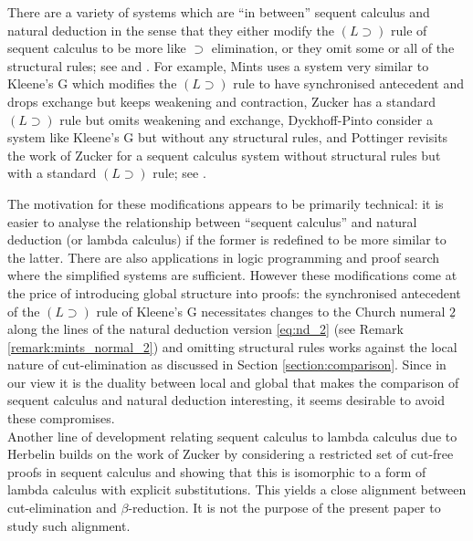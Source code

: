 \documentclass[english,letter paper,12pt,leqno]{article}
\theoremstyle{example}
\numberwithin{equation}{section}
\def\imp{\supset}
\begin{document}
There are a variety of systems which are ``in between'' sequent calculus and natural deduction in the sense that they either modify the $(L \imp)$ rule of sequent calculus to be more like $\imp$ elimination, or they omit some or all of the structural rules; see \cite{negri} and \cite[\S 2.2, \S 2.3, \S 2.4]{negriplato}. For example, Mints uses a system very similar to Kleene's G \cite{kleene} which modifies the $(L \imp)$ rule to have synchronised antecedent and drops exchange but keeps weakening and contraction, Zucker has a standard $(L \imp)$ rule but omits weakening and exchange, Dyckhoff-Pinto \cite{dyckhoffpinto} consider a system like Kleene's G but without any structural rules, and Pottinger \cite{pottinger} revisits the work of Zucker for a sequent calculus system without structural rules but with a standard $(L \imp)$ rule; see \cite[p.331]{pottinger}.

The motivation for these modifications appears to be primarily technical: it is easier to analyse the relationship between ``sequent calculus'' and natural deduction (or lambda calculus) if the former is redefined to be more similar to the latter. There are also applications in logic programming and proof search \cite{dyckhoffpinto} where the simplified systems are sufficient. However these modifications come at the price of introducing global structure into proofs: the synchronised antecedent of the $(L \imp)$ rule of Kleene's G necessitates changes to the Church numeral $\underline{2}$ along the lines of the natural deduction version \eqref{eq:nd_2} (see Remark \ref{remark:mints_normal_2}) and omitting structural rules works against the local nature of cut-elimination as discussed in Section \ref{section:comparison}. Since in our view it is the duality between local and global that makes the comparison of sequent calculus and natural deduction interesting, it seems desirable to avoid these compromises.
\\

Another line of development relating sequent calculus to lambda calculus due to Herbelin \cite{herbelin} builds on the work of Zucker \cite{zucker} by considering a restricted set of cut-free proofs in sequent calculus and showing that this is isomorphic to a form of lambda calculus with explicit substitutions. This yields a close alignment between cut-elimination and $\beta$-reduction. It is not the purpose of the present paper to study such alignment.

\end{document}

